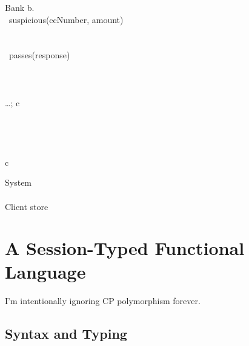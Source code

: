 \documentclass[orivec,envcountsame]{llncs}
\begin{document}
\begin{code}
Bank  \lambda b. \bl
   \\
  \ suspicious(ccNumber, amount)\  \\
  \quad\bl
     \\
     \\
    \ passes(response)\  \\
    \quad \bl
       \\
       \\
       \\
      \dots; c \el \\
     \\
    \quad \bl
       \\
       \\
       \\
      c \el
  \el
\el
\end{code}

\begin{code}
System  \bl
   \\
   \\
  Client \app store
\el
\end{code}

\section{A Session-Typed Functional Language}\label{sec:gv}

I'm intentionally ignoring CP polymorphism forever.

\subsection{Syntax and Typing}\label{sec:gv-static}
\end{document}
